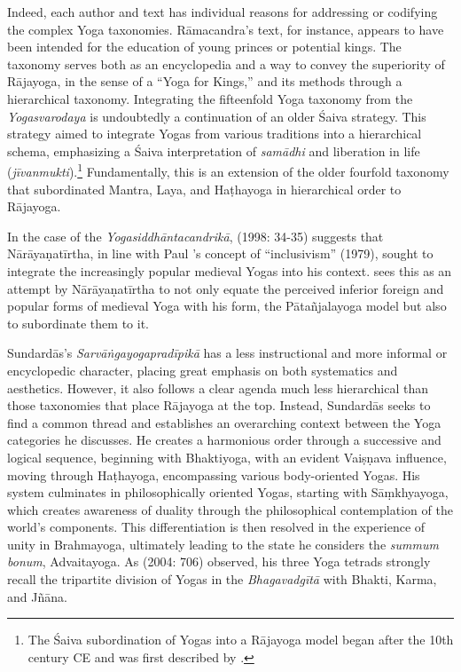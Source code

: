 Indeed, each author and text has individual reasons for addressing or codifying the complex Yoga taxonomies. Rāmacandra's text, for instance, appears to have been intended for the education of young princes or potential kings. The taxonomy serves both as an encyclopedia and a way to convey the superiority of Rājayoga, in the sense of a ``Yoga for Kings,'' and its methods through a hierarchical taxonomy. Integrating the fifteenfold Yoga taxonomy from the \textit{Yogasvarodaya} is undoubtedly a continuation of an older Śaiva strategy. This strategy aimed to integrate Yogas from various traditions into a hierarchical schema, emphasizing a Śaiva interpretation of \textit{samādhi} and liberation in life (\textit{jīvanmukti}).\footnote{The Śaiva subordination of Yogas into a Rājayoga model began after the 10th century CE and was first described by \citeauthor[2019]{birch2019}.} Fundamentally, this is an extension of the older fourfold taxonomy that subordinated Mantra, Laya, and Haṭhayoga in hierarchical order to Rājayoga.

In the case of the \textit{Yogasiddhāntacandrikā}, \citeauthor{endo1998} (1998: 34-35) suggests that Nārāyaṇatīrtha, in line with Paul \citeauthor{hacker1979}'s concept of ``inclusivism'' (1979), sought to integrate the increasingly popular medieval Yogas into his context. \citeauthor{endo1998} sees this as an attempt by Nārāyaṇatīrtha to not only equate the perceived inferior foreign and popular forms of medieval Yoga with his form, the Pātañjalayoga model but also to subordinate them to it.

Sundardās's \textit{Sarvāṅgayogapradīpikā} has a less instructional and more informal or encyclopedic character, placing great emphasis on both systematics and aesthetics. However, it also follows a clear agenda much less hierarchical than those taxonomies that place Rājayoga at the top. Instead, Sundardās seeks to find a common thread and establishes an overarching context between the Yoga categories he discusses. He creates a harmonious order through a successive and logical sequence, beginning with Bhaktiyoga, with an evident Vaiṣṇava influence, moving through Haṭhayoga, encompassing various body-oriented Yogas. His system culminates in philosophically oriented Yogas, starting with Sāṃkhyayoga, which creates awareness of duality through the philosophical contemplation of the world's components. This differentiation is then resolved in the experience of unity in Brahmayoga, ultimately leading to the state he considers the \textit{summum bonum}, Advaitayoga. As \citeauthor{burger2014sarvangayogapradipika} (2004: 706) observed, his three Yoga tetrads strongly recall the tripartite division of Yogas in the \emph{Bhagavadgītā} with Bhakti, Karma, and Jñāna.

